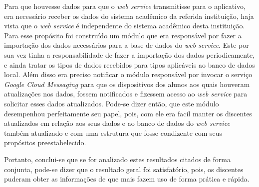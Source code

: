	\par Para que houvesse dados para que o \textit{web service} transmitisse para
o aplicativo, era necessário receber os dados do sistema acadêmico da referida
instituição, haja vista que o \textit{web service} é independente do sistema
acadêmico desta instituição. Para esse propósito foi construído um módulo que
era responsável por fazer a importação dos dados necessários para a base de
dados do \textit{web service}. Este por sua vez tinha a responsabilidade de
fazer a importação dos dados periodicamente, e ainda tratar os tipos de dados
recebidos para tipos aplicáveis ao banco de dados local. Além disso era
preciso notificar o módulo responsável por invocar o serviço \textit{Google
Cloud Messaging} para que os dispositivos dos alunos aos quais houveram
atualizações nos dados, fossem notificados e fizessem acesso ao \textit{web
service} para solicitar esses dados atualizados. Pode-se dizer então, que este
módulo desempenhou perfeitamente seu papel, pois, com ele era facil manter os
discentes atualizados em relação aos seus dados e ao banco de dados do
\textit{web service} também atualizado e com uma estrutura que fosse condizente
com seus propósitos preestabelecido. 
	
	\par Portanto, conclui-se que se for analizado estes resultados citados de
forma conjunta, pode-se dizer que o resultado geral foi satisfatório, pois, os
discentes puderam obter as informações de que mais fazem uso de forma prática e
rápida.


